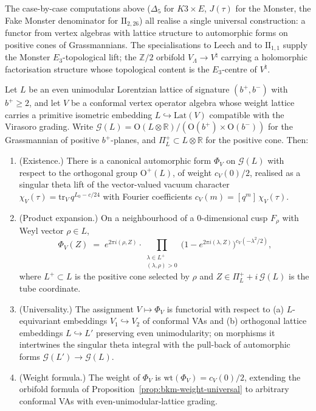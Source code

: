 The case-by-case computations above ($\Delta_5$ for $K3 \times E$, $J(\tau)$ for the Monster, the Fake Monster denominator for $\mathrm{II}_{2,26}$) all realise a single universal construction: a functor from vertex algebras with lattice structure to automorphic forms on positive cones of Grassmannians. The specialisations to Leech and to $\mathrm{II}_{1,1}$ supply the Monster $E_3$-topological lift; the $\mathbb{Z}/2$ orbifold $V_\Lambda \to V^\natural$ carrying a holomorphic factorisation structure whose topological content is the $E_3$-centre of $V^\natural$.

\begin{theorem}
\label{thm:borcherds-lift-universal}
Let $L$ be an even unimodular Lorentzian lattice of signature $(b^+, b^-)$ with $b^+ \ge 2$, and let $V$ be a conformal vertex operator algebra whose weight lattice carries a primitive isometric embedding $L \hookrightarrow \mathrm{Lat}(V)$ compatible with the Virasoro grading. Write $\mathcal{G}(L) = \mathrm{O}(L \otimes \mathbb{R}) / (\mathrm{O}(b^+) \times \mathrm{O}(b^-))$ for the Grassmannian of positive $b^+$-planes, and $\Pi^+_L \subset L \otimes \mathbb{R}$ for the positive cone. Then:
\begin{enumerate}[label=\textup{(\roman*)}]
 \item \textup{(Existence.)} There is a canonical automorphic form $\Phi_V$ on $\mathcal{G}(L)$ with respect to the orthogonal group $\mathrm{O}^+(L)$, of weight $c_V(0)/2$, realised as a singular theta lift of the vector-valued vacuum character $\chi_V(\tau) = \mathrm{tr}_V\, q^{L_0 - c/24}$ with Fourier coefficients $c_V(m) = [q^m]\,\chi_V(\tau)$.
 \item \textup{(Product expansion.)} On a neighbourhood of a $0$-dimensional cusp $F_\rho$ with Weyl vector $\rho \in L$,
 \[
 \Phi_V(Z) \;=\; e^{2\pi i (\rho, Z)} \cdot \prod_{\substack{\lambda \in L^+ \\ (\lambda, \rho) > 0}} \bigl(1 - e^{2\pi i (\lambda, Z)}\bigr)^{c_V(-\lambda^2/2)},
 \]
 where $L^+ \subset L$ is the positive cone selected by $\rho$ and $Z \in \Pi^+_L + i\, \mathcal{G}(L)$ is the tube coordinate.
 \item \textup{(Universality.)} The assignment $V \mapsto \Phi_V$ is functorial with respect to (a) $L$-equivariant embeddings $V_1 \hookrightarrow V_2$ of conformal VAs and (b) orthogonal lattice embeddings $L \hookrightarrow L'$ preserving even unimodularity; on morphisms it intertwines the singular theta integral with the pull-back of automorphic forms $\mathcal{G}(L') \to \mathcal{G}(L)$.
 \item \textup{(Weight formula.)} The weight of $\Phi_V$ is $\mathrm{wt}(\Phi_V) = c_V(0)/2$, extending the orbifold formula of Proposition~\ref{prop:bkm-weight-universal} to arbitrary conformal VAs with even-unimodular-lattice grading.
\end{enumerate}
\end{theorem}

